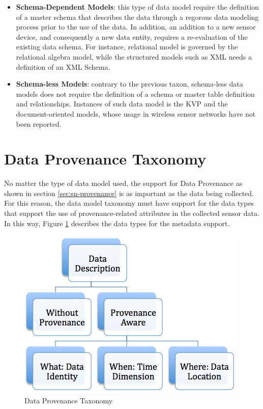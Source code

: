 \begin{itemize}
  \item \textbf{Schema-Dependent Models}: this type of data model require
  the definition of a master schema that describes the data through a regorous
  data modeling process prior to the use of the data. In addition, an addition
 to a new sensor device, and consequently a new data entity, requires a
 re-evaluation of the existing data schema. For instance, relational model is
 governed by the relational algebra model, while the structured models such as
 XML needs a definition of an XML Schema.
  \item \textbf{Schema-less Models}: contrary to the previous taxon, 
  schema-less data models does not require the definition of a schema or master
  table definition and relationships. Instances of such data model is the KVP
  and the document-oriented models, whose usage in wireless sensor networks
  have not been reported.
\end{itemize}

\section{Data Provenance Taxonomy}

No matter the type of data model used, the support for Data Provenance as shown
in section \ref{sec:sn-provenance} is as important as the data being collected.
For this reason, the data model taxonomy must have support for the data types
that support the use of provenance-related attributes in the collected sensor
data. In this way, Figure \ref{fig:taxonomy-data-provenance} describes the data types
for the metadata support.

\begin{figure}[h]
  \centering
  \includegraphics{../diagrams/taxonomy-data-provenance}
  \caption{Data Provenance Taxonomy}
  \label{fig:taxonomy-data-provenance}
\end{figure}

